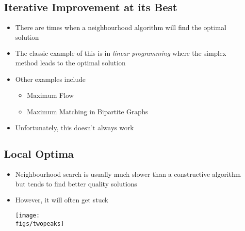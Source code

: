 
\begin{slide}
\section{Iterative Improvement at its Best}

\begin{PauseHighLight}
  \begin{itemize}
  \item There are times when a neighbourhood algorithm will find the
    optimal solution\pause
  \item The classic example of this is in \emph{linear programming}
    where the simplex method leads to the optimal solution\pause
  \item Other examples include
    \begin{itemize}
    \item Maximum Flow
    \item Maximum Matching in Bipartite Graphs\pause
    \end{itemize}
  \item Unfortunately, this doesn't always work\pauseb
  \end{itemize}
\end{PauseHighLight}


\end{slide}



\begin{slide}
\section[-1]{Local Optima}

\begin{PauseHighLight}
  \begin{itemize}
  \item Neighbourhood search is usually much slower than a constructive
    algorithm but tends to find better quality solutions\pause
  \item However, it will often get stuck
  \begin{center}
    \texttt{[image: \\figs/twopeaks]}\pause
  \end{center}
  \end{itemize}
\end{PauseHighLight}

\end{slide}

